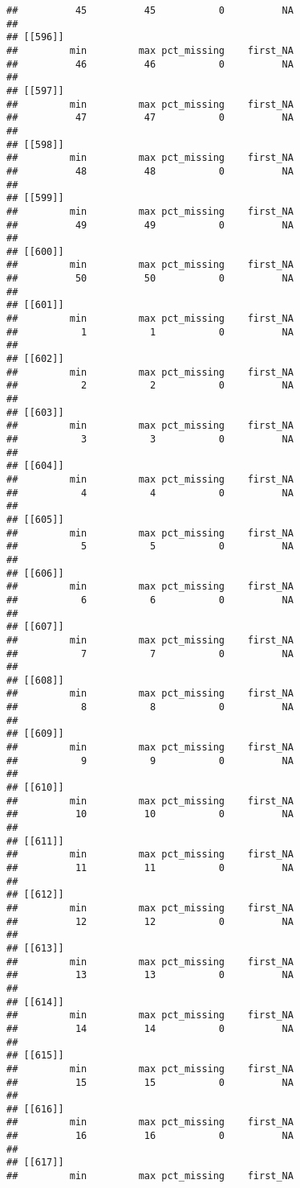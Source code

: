 \documentclass[
]{article}
\begin{document}
\begin{verbatim}
##          45          45           0          NA 
## 
## [[596]]
##         min         max pct_missing    first_NA 
##          46          46           0          NA 
## 
## [[597]]
##         min         max pct_missing    first_NA 
##          47          47           0          NA 
## 
## [[598]]
##         min         max pct_missing    first_NA 
##          48          48           0          NA 
## 
## [[599]]
##         min         max pct_missing    first_NA 
##          49          49           0          NA 
## 
## [[600]]
##         min         max pct_missing    first_NA 
##          50          50           0          NA 
## 
## [[601]]
##         min         max pct_missing    first_NA 
##           1           1           0          NA 
## 
## [[602]]
##         min         max pct_missing    first_NA 
##           2           2           0          NA 
## 
## [[603]]
##         min         max pct_missing    first_NA 
##           3           3           0          NA 
## 
## [[604]]
##         min         max pct_missing    first_NA 
##           4           4           0          NA 
## 
## [[605]]
##         min         max pct_missing    first_NA 
##           5           5           0          NA 
## 
## [[606]]
##         min         max pct_missing    first_NA 
##           6           6           0          NA 
## 
## [[607]]
##         min         max pct_missing    first_NA 
##           7           7           0          NA 
## 
## [[608]]
##         min         max pct_missing    first_NA 
##           8           8           0          NA 
## 
## [[609]]
##         min         max pct_missing    first_NA 
##           9           9           0          NA 
## 
## [[610]]
##         min         max pct_missing    first_NA 
##          10          10           0          NA 
## 
## [[611]]
##         min         max pct_missing    first_NA 
##          11          11           0          NA 
## 
## [[612]]
##         min         max pct_missing    first_NA 
##          12          12           0          NA 
## 
## [[613]]
##         min         max pct_missing    first_NA 
##          13          13           0          NA 
## 
## [[614]]
##         min         max pct_missing    first_NA 
##          14          14           0          NA 
## 
## [[615]]
##         min         max pct_missing    first_NA 
##          15          15           0          NA 
## 
## [[616]]
##         min         max pct_missing    first_NA 
##          16          16           0          NA 
## 
## [[617]]
##         min         max pct_missing    first_NA 

\end{verbatim}
\end{document}
